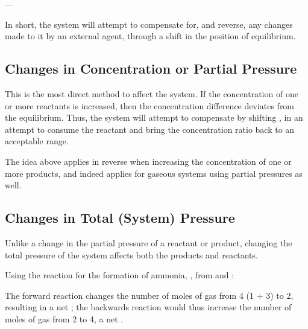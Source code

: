 
			--- 

			In short, the system will attempt to compensate for, and reverse, any changes made to it by an external agent, through a shift
			in the position of equilibrium.



		\subsection{Changes in Concentration or Partial Pressure}

			This is the most direct method to affect the system. If the concentration of one or more reactants is increased, then the
			concentration difference deviates from the equilibrium. Thus, the system will attempt to compensate by shifting ,
			in an attempt to consume the reactant and bring the concentration ratio back to an acceptable range.

			The idea above applies in reverse when increasing the concentration of one or more products, and indeed applies for gaseous
			systems using partial pressures as well.




		\subsection{Changes in Total (System) Pressure}

			Unlike a change in the partial pressure of a reactant or product, changing the total pressure of the system affects both
			the products and reactants.

			Using the reaction for the formation of ammonia, , from  and :


			The forward reaction changes the number of moles of gas from \num{4} (\num{1} + \num{3}) to \num{2}, resulting in a net
			; the backwards reaction would thus increase the number of moles of gas from \num{2} to \num{4}, a net
			.


